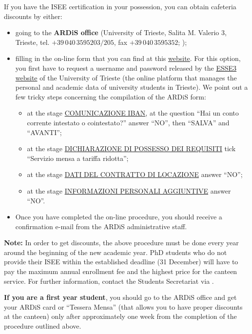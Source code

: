 \documentclass{sissavademecum}
\begin{document}
\noindent If you have the ISEE certification in your possession, you can obtain cafeteria discounts by either:
\begin{itemize}
    \item going to the \textbf{ARDiS office} (University of Trieste,
    Salita M. Valerio 3, Trieste, tel. $+39 \, 040 \,3595203/205$, fax $+39 \, 040 \, 3595352$;
    );
    \item filling in the on-line form that you can find at this \href{https://ardiss-ol.dirittoallostudio.it/istud/}{website}. For this option, you first have to request a username and password released by the \href{https://esse3.units.it/Home.do}{ESSE3 website} of the University of Trieste (the online platform that manages the personal and academic data of university students in Trieste). We point out a few tricky steps concerning the compilation of the ARDiS form:
    \begin{itemize}
    \item at the stage \underline{COMUNICAZIONE IBAN}, at the question ``Hai un conto corrente intestato o cointestato?'' answer ``NO'', then ``SALVA'' and ``AVANTI'';
    \item at the stage \underline{DICHIARAZIONE DI POSSESSO DEI REQUISITI} tick ``Servizio mensa a tariffa ridotta'';
    \item at the stage \underline{DATI DEL CONTRATTO DI LOCAZIONE} answer ``NO'';
    \item at the stage \underline{INFORMAZIONI PERSONALI AGGIUNTIVE} answer ``NO''.
\end{itemize}
\item Once you have completed the on-line procedure, you should receive a confirmation e-mail from the ARDiS administrative staff.
\end{itemize}

\textbf{Note:} In order to get discounts, the above procedure must be done every year around the beginning of the new academic year. PhD students who do not provide their ISEE within the established deadline (31 December) will have to pay the maximum annual enrollment fee and the highest price for the canteen service. For further information, contact the Students Secretariat via .

\textbf{If you are a first year student}, you should go to the ARDiS office and get your ARDiS card or ``Tessera Mensa'' (that allows you to have proper discounts at the canteen) only after approximately one week from the completion of the procedure outlined above.
\end{document}

